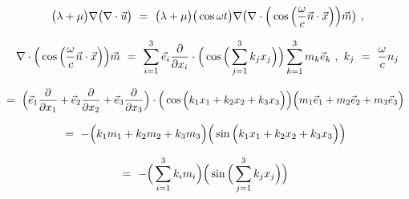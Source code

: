 \documentclass{article}
\begin{document}
\begin{equation} \label{eb-eq-1-146}
\big( \lambda + \mu \big) \nabla \big( \nabla \cdot \vec{u} \big) \hspace{0.125cm} = \hspace{0.125cm} \big( \lambda + \mu \big) \big( \cos{ \omega t } \big) \nabla \big( \nabla \cdot \Big( \cos \Big( \frac{\omega}{c} \vec{n} \cdot \vec{x} \Big) \Big) \vec{m} \big) \hspace{0.125cm} ,
\end{equation}

\begin{equation} \label{eb-eq-1-147}
\nabla \cdot \Big( \cos \Big( \frac{\omega}{c} \vec{n} \cdot \vec{x} \Big) \Big) \vec{m} \hspace{0.125cm} = \hspace{0.125cm} \sum_{i = 1}^{3} \vec{e}_i \frac{\partial}{\partial{x_i}} \cdot \Big( \cos \Big( \sum_{j = 1}^{3} k_j x_j \Big) \Big) \sum_{k = 1}^{3} m_k \vec{e}_k \hspace{0.125cm} ,  \hspace{0.125cm} k_j \hspace{0.125cm} = \hspace{0.125cm} \frac{\omega}{c} n_j 
\end{equation}

\begin{equation} \label{eb-eq-1-148}
= \hspace{0.125cm} \Big( \vec{e}_1 \frac{\partial}{\partial{x_1}} + \vec{e}_2 \frac{\partial}{\partial{x_2}} + \vec{e}_3 \frac{\partial}{\partial{x_3}} \Big)  \cdot \Big( \cos \Big( k_1 x_1 + k_2 x_2 + k_3 x_3 \Big) \Big) \Big( m_1 \vec{e}_1 + m_2 \vec{e}_2 + m_3 \vec{e}_3 \Big) \hspace{0.125cm}
\end{equation}

\begin{equation} \label{eb-eq-1-149}
= \hspace{0.125cm} - \Big( k_1 m_1 + k_2 m_2 + k_3 m_3 \Big) \Big( \sin \Big( k_1 x_1 + k_2 x_2 + k_3 x_3 \Big) \Big) \hspace{0.125cm} 
\end{equation}

\begin{equation} \label{eb-eq-1-150}
= \hspace{0.125cm} - \Big( \sum_{i = 1}^{3} k_i m_i \Big) \Big( \sin \Big( \sum_{j = 1}^{3} k_j x_j \Big) \Big) \hspace{0.125cm} 
\end{equation}
\end{document}
